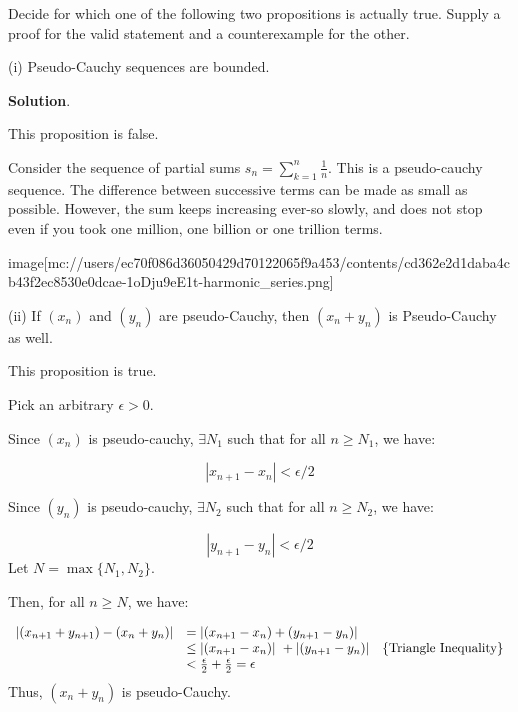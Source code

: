 \documentclass[10pt]{article}
\begin{document}
Decide for which one of the following two propositions is actually true. Supply a proof for the valid statement and a counterexample for the other.



(i) Pseudo-Cauchy sequences are bounded.



\textbf{Solution}.



This proposition is false.

Consider the sequence of partial sums $\displaystyle s_{n} =\sum _{k=1}^{n}\frac{1}{n}$. This is a pseudo-cauchy sequence. The difference between successive terms can be made as small as possible. However, the sum keeps increasing ever-so slowly, and does not stop even if you took one million, one billion or one trillion terms.

image[mc://users/ec70f086d36050429d70122065f9a453/contents/cd362e2d1daba4cb43f2ec8530e0dcae-1oDju9eE1t-harmonic_series.png]



(ii) If $\displaystyle ( x_{n})$ and $\displaystyle ( y_{n})$ are pseudo-Cauchy, then $\displaystyle ( x_{n} +y_{n})$ is Pseudo-Cauchy as well.



This proposition is true.



Pick an arbitrary $\displaystyle \epsilon  >0$.



Since $\displaystyle ( x_{n})$ is pseudo-cauchy, $\displaystyle \exists N_{1}$ such that for all $\displaystyle n\geq N_{1}$, we have:


\begin{equation*}
|x_{n+1} -x_{n} |< \epsilon /2
\end{equation*}


Since $\displaystyle ( y_{n})$ is pseudo-cauchy, $\displaystyle \exists N_{2}$ such that for all $\displaystyle n\geq N_{2}$, we have:


\begin{equation*}
|y_{n+1} -y_{n} |< \epsilon /2
\end{equation*}
Let $\displaystyle N=\max\{N_{1} ,N_{2}\}$.



Then, for all $\displaystyle n\geq N$, we have:


\begin{equation*}
\begin{array}{ c l c }
|( x_{n+1} +y_{n+1}) -( x_{n} +y_{n}) | & =| ( x_{n+1} -x_{n}) +( y_{n+1} -y_{n})|  & \\
 & \leq | ( x_{n+1} -x_{n}) |\ +|( y_{n+1} -y_{n}) | & \left\{\text{Triangle Inequality}\right\}\\
 & < \frac{\epsilon }{2} +\frac{\epsilon }{2} =\epsilon  & 
\end{array}
\end{equation*}
Thus, $\displaystyle ( x_{n} +y_{n})$ is pseudo-Cauchy.
\end{document}
